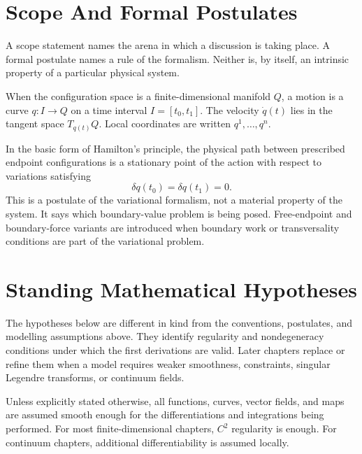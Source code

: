 \section{Scope And Formal Postulates}
\label{sec:scope-postulates}

A scope statement names the arena in which a discussion is taking place. A
formal postulate names a rule of the formalism. Neither is, by itself, an
intrinsic property of a particular physical system.

\begin{setting}
When the configuration space is a finite-dimensional manifold \(Q\), a motion is
a curve \(q:I\to Q\) on a time interval \(I=[t_0,t_1]\). The velocity
\(\dot q(t)\) lies in the tangent space \(T_{q(t)}Q\). Local coordinates are
written \(q^1,\ldots,q^n\).
\end{setting}

\begin{postulate}
In the basic form of Hamilton's principle, the physical path between prescribed
endpoint configurations is a stationary point of the action with respect to
variations satisfying
\[
  \delta q(t_0)=\delta q(t_1)=0.
\]
This is a postulate of the variational formalism, not a material property of
the system.  It says which boundary-value problem is being posed. Free-endpoint
and boundary-force variants are introduced when boundary work or
transversality conditions are part of the variational problem.
\end{postulate}

\section{Standing Mathematical Hypotheses}
\label{sec:standing-hypotheses}

The hypotheses below are different in kind from the conventions, postulates,
and modelling assumptions above. They identify regularity and nondegeneracy
conditions under which the first derivations are valid. Later chapters replace
or refine them when a model requires weaker smoothness, constraints, singular
Legendre transforms, or continuum fields.

\begin{hypothesis}[Smoothness]
Unless explicitly stated otherwise, all functions, curves, vector fields, and
maps are assumed smooth enough for the differentiations and integrations being
performed. For most finite-dimensional chapters, \(C^2\) regularity is enough.
For continuum chapters, additional differentiability is assumed locally.
\end{hypothesis}

